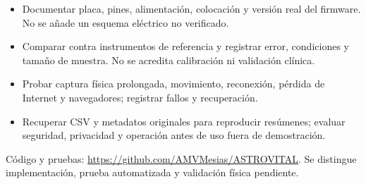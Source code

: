 \begin{itemize}
\item Documentar placa, pines, alimentación, colocación y versión real del firmware. No se añade un esquema eléctrico no verificado.
\item Comparar contra instrumentos de referencia y registrar error, condiciones y tamaño de muestra. No se acredita calibración ni validación clínica.
\item Probar captura física prolongada, movimiento, reconexión, pérdida de Internet y navegadores; registrar fallos y recuperación.
\item Recuperar CSV y metadatos originales para reproducir resúmenes; evaluar seguridad, privacidad y operación antes de uso fuera de demostración.
\end{itemize}
{\footnotesize\color{muted}Código y pruebas: \url{https://github.com/AMVMesias/ASTROVITAL}. Se distingue implementación, prueba automatizada y validación física pendiente.}
